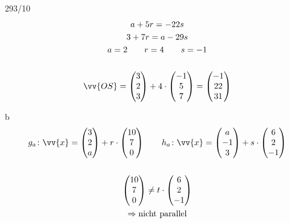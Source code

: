 \begin{exercise}{293/10}
\begin{gather*}
    a + 5r = -22s \\
    3 + 7r = a - 29s \\
    a = 2 \qquad r = 4 \qquad s = -1 \\\\
    \vv{OS} = \begin{pmatrix}3 \\ 2 \\ 3\end{pmatrix} + 4 \cdot \begin{pmatrix}-1 \\ 5 \\ 7\end{pmatrix} = \begin{pmatrix}-1 \\ 22 \\ 31\end{pmatrix}
  \end{gather*}
  \item [b]
  \begin{gather*}
    g_a \colon \vv{x} = \begin{pmatrix}3 \\ 2 \\ a\end{pmatrix} + r \cdot \begin{pmatrix}10 \\ 7 \\ 0\end{pmatrix} \qquad h_a \colon \vv{x} = \begin{pmatrix}a \\ -1 \\ 3\end{pmatrix} + s \cdot \begin{pmatrix}6 \\ 2 \\ -1\end{pmatrix} \\\\
    \begin{pmatrix}10 \\ 7 \\ 0\end{pmatrix} \neq t \cdot \begin{pmatrix}6 \\ 2 \\ -1\end{pmatrix} \\
    \Rightarrow \text{nicht parallel} \\\\

\end{gather*}
\end{exercise}
